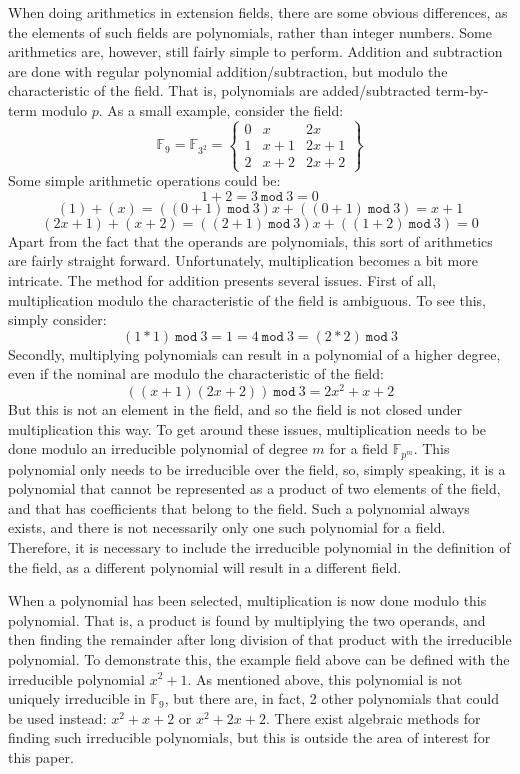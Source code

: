 \noindent When doing arithmetics in extension fields, there are some obvious differences, as the elements of such fields are polynomials, rather than integer numbers. Some arithmetics are, however, still fairly simple to perform. Addition and subtraction are done with regular polynomial addition/subtraction, but modulo the characteristic of the field. That is, polynomials are added/subtracted term-by-term modulo $p$. As a small example, consider the field:
\[\mathbb{F}_9=\mathbb{F}_{3^2}=\begin{Bmatrix}
0 & x   & 2x   \\
1 & x+1 & 2x+1 \\
2 & x+2 & 2x+2
\end{Bmatrix}
\]
Some simple arithmetic operations could be:
\[1+2=3 ~ \mathtt{mod} ~ 3=0\]
\[(1)+(x)=((0+1) ~ \mathtt{mod} ~ 3)x+((0+1) ~ \mathtt{mod} ~ 3)=x+1\]
\[(2x+1)+(x+2)=((2+1) ~ \mathtt{mod} ~ 3)x+((1+2) ~ \mathtt{mod} ~ 3)=0\]
Apart from the fact that the operands are polynomials, this sort of arithmetics are fairly straight forward. Unfortunately, multiplication becomes a bit more intricate. The method for addition presents several issues. First of all, multiplication modulo the characteristic of the field is ambiguous. To see this, simply consider:
\[(1*1) ~ \mathtt{mod} ~ 3=1=4 ~ \mathtt{mod} ~ 3=(2*2) ~ \mathtt{mod} ~ 3\]
Secondly, multiplying polynomials can result in a polynomial of a higher degree, even if the nominal are modulo the characteristic of the field:
\[((x+1)(2x+2)) ~ \mathtt{mod} ~ 3=2x^2+x+2\]
But this is not an element in the field, and so the field is not closed under multiplication this way. To get around these issues, multiplication needs to be done modulo an irreducible polynomial of degree $m$ for a field $\mathbb{F}_{p^m}$. This polynomial only needs to be irreducible over the field, so, simply speaking, it is a polynomial that cannot be represented as a product of two elements of the field, and that has coefficients that belong to the field. Such a polynomial always exists, and there is not necessarily only one such polynomial for a field. Therefore, it is necessary to include the irreducible polynomial in the definition of the field, as a different polynomial will result in a different field.

When a polynomial has been selected, multiplication is now done modulo this polynomial. That is, a product is found by multiplying the two operands, and then finding the remainder after long division of that product with the irreducible polynomial. To demonstrate this, the example field above can be defined with the irreducible polynomial $x^2+1$. As mentioned above, this polynomial is not uniquely irreducible in $\mathbb{F}_9$, but there are, in fact, 2 other polynomials that could be used instead: $x^2+x+2$ or $x^2+2x+2$. There exist algebraic methods for finding such irreducible polynomials\cite{findingIrreducible}, but this is outside the area of interest for this paper.

